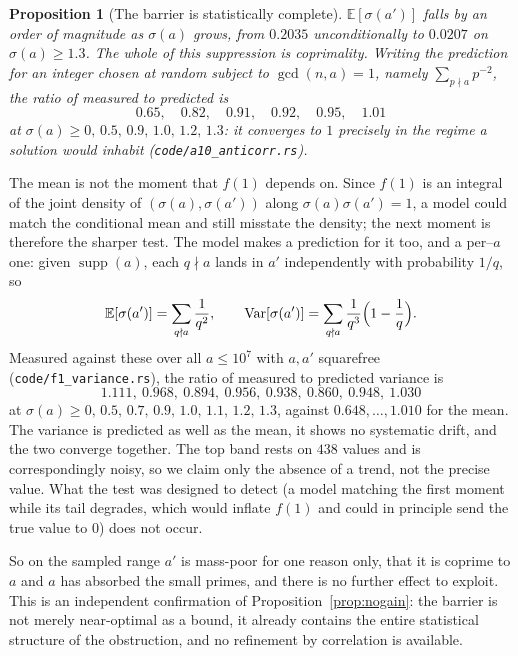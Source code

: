 \documentclass[11pt]{article}
\newtheorem{proposition}[theorem]{Proposition}
\theoremstyle{definition}
\begin{document}
\begin{proposition}[The barrier is statistically complete]\label{prop:anticorr}
$\mathbb{E}[\sigma(a')]$ falls by an order of magnitude as $\sigma(a)$ grows, from $0.2035$
unconditionally to $0.0207$ on $\sigma(a)\ge1.3$. The whole of this suppression is coprimality.
Writing the prediction for an integer chosen at random subject to $\gcd(n,a)=1$, namely
$\sum_{p\nmid a}p^{-2}$, the ratio of measured to predicted is
\[ 0.65,\quad 0.82,\quad 0.91,\quad 0.92,\quad 0.95,\quad 1.01 \]
at $\sigma(a)\ge0,\,0.5,\,0.9,\,1.0,\,1.2,\,1.3$: it converges to $1$ precisely in the regime a
solution would inhabit \textup{(\texttt{code/a10\_anticorr.rs})}.
\end{proposition}

The mean is not the moment that $f(1)$ depends on. Since $f(1)$ is an integral of the joint density
of $(\sigma(a),\sigma(a'))$ along $\sigma(a)\sigma(a')=1$, a model could match the conditional mean
and still misstate the density; the next moment is therefore the sharper test. The model makes a
prediction for it too, and a per--$a$ one: given $\operatorname{supp}(a)$, each $q\nmid a$ lands in
$a'$ independently with probability $1/q$, so
\[ \mathbb{E}[\sigma(a')]=\sum_{q\nmid a}\frac1{q^{2}},\qquad
   \operatorname{Var}[\sigma(a')]=\sum_{q\nmid a}\frac1{q^{3}}\Bigl(1-\frac1q\Bigr). \]
Measured against these over all $a\le10^{7}$ with $a,a'$ squarefree
\textup{(\texttt{code/f1\_variance.rs})}, the ratio of measured to predicted variance is
\[ 1.111,\ 0.968,\ 0.894,\ 0.956,\ 0.938,\ 0.860,\ 0.948,\ 1.030 \]
at $\sigma(a)\ge0,\,0.5,\,0.7,\,0.9,\,1.0,\,1.1,\,1.2,\,1.3$, against $0.648,\dots,1.010$ for the
mean. The variance is predicted as well as the mean, it shows no systematic drift, and the two
converge together. The top band rests on $438$ values and is correspondingly noisy, so we claim only
the absence of a trend, not the precise value. What the test was designed to detect (a model
matching the first moment while its tail degrades, which would inflate $f(1)$ and could in principle
send the true value to $0$) does not occur.

So on the sampled range $a'$ is mass-poor for one reason only, that it is coprime to $a$ and $a$ has
absorbed the small primes, and there is no further effect to exploit. This is an independent
confirmation of Proposition~\ref{prop:nogain}: the barrier is not merely near-optimal as a bound, it
already contains the entire statistical structure of the obstruction, and no refinement by
correlation is available.
\end{document}
